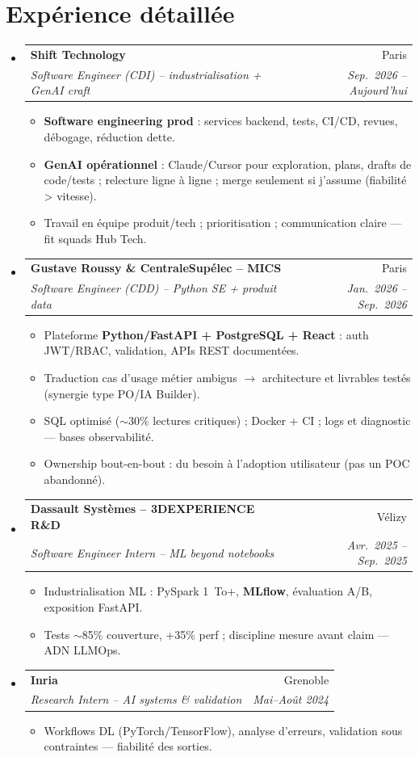 \documentclass[a4paper,10.5pt]{article}
\makeatletter
\newcommand{\resumeItem}[1]{\item\small{#1}}
\newcommand{\resumeSubheading}[4]{\vspace{2.5pt}\item\begin{tabular*}{0.97\textwidth}[t]{l@{\extracolsep{\fill}}r}\textbf{#1}&{#2}\\\textit{\small #3}&\textit{\small #4}\\\end{tabular*}\vspace{1pt}}
\newcommand{\resumeSubHeadingListStart}{\begin{itemize}[leftmargin=0.08in,label={}]}
\newcommand{\resumeSubHeadingListEnd}{\end{itemize}}
\makeatother
\begin{document}
\section{Exp\'erience d\'etaill\'ee}
\resumeSubHeadingListStart
  \resumeSubheading
    {Shift Technology}{Paris}
    {Software Engineer (CDI) -- industrialisation + GenAI craft}{Sep.~2026 -- Aujourd'hui}
    \begin{itemize}
      \resumeItem{\textbf{Software engineering prod} : services backend, tests, CI/CD, revues, d\'ebogage, r\'eduction dette.}
      \resumeItem{\textbf{GenAI op\'erationnel} : Claude/Cursor pour exploration, plans, drafts de code/tests ; relecture ligne \`a ligne ; merge seulement si j'assume (fiabilit\'e > vitesse).}
      \resumeItem{Travail en \'equipe produit/tech ; prioritisation ; communication claire --- fit squads Hub Tech.}
    \end{itemize}
  \resumeSubheading
    {Gustave Roussy \& CentraleSup\'elec -- MICS}{Paris}
    {Software Engineer (CDD) -- Python SE + produit data}{Jan.~2026 -- Sep.~2026}
    \begin{itemize}
      \resumeItem{Plateforme \textbf{Python/FastAPI + PostgreSQL + React} : auth JWT/RBAC, validation, APIs REST document\'ees.}
      \resumeItem{Traduction cas d'usage m\'etier ambigus $\rightarrow$ architecture et livrables test\'es (synergie type PO/IA Builder).}
      \resumeItem{SQL optimis\'e ($\sim$30\% lectures critiques) ; Docker + CI ; logs et diagnostic --- bases observabilit\'e.}
      \resumeItem{Ownership bout-en-bout : du besoin \`a l'adoption utilisateur (pas un POC abandonn\'e).}
    \end{itemize}
  \resumeSubheading
    {Dassault Syst\`emes -- 3DEXPERIENCE R\&D}{V\'elizy}
    {Software Engineer Intern -- ML beyond notebooks}{Avr.~2025 -- Sep.~2025}
    \begin{itemize}
      \resumeItem{Industrialisation ML : PySpark 1~To+, \textbf{MLflow}, \'evaluation A/B, exposition FastAPI.}
      \resumeItem{Tests $\sim$85\% couverture, +35\% perf ; discipline mesure avant claim --- ADN LLMOps.}
    \end{itemize}
  \resumeSubheading
    {Inria}{Grenoble}
    {Research Intern -- AI systems \& validation}{Mai--Ao\^ut 2024}
    \begin{itemize}
      \resumeItem{Workflows DL (PyTorch/TensorFlow), analyse d'erreurs, validation sous contraintes --- fiabilit\'e des sorties.}
    \end{itemize}
\resumeSubHeadingListEnd
\end{document}
